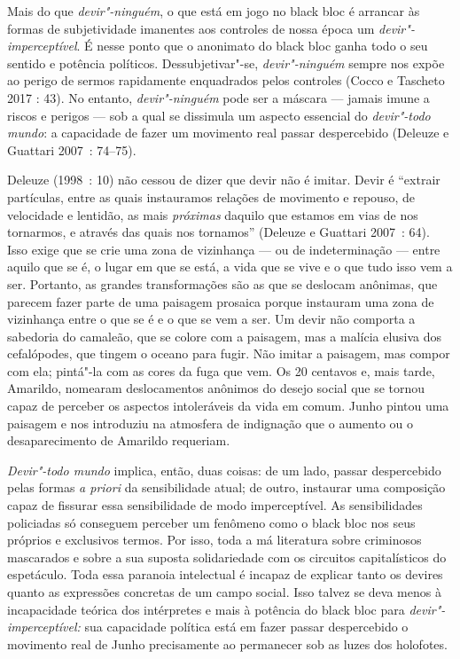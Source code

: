 Mais do que \emph{devir"-ninguém}, o que está em jogo no black bloc
é arrancar às formas de subjetividade imanentes aos controles de nossa
época um \emph{devir"-imperceptível}. É nesse ponto que o anonimato do
black bloc ganha todo o seu sentido e potência políticos.
Dessubjetivar"-se, \emph{devir"-ninguém} sempre nos expõe ao perigo de
sermos rapidamente enquadrados pelos controles (Cocco e Tascheto 2017 :
43). No entanto, \emph{devir"-ninguém} pode ser a máscara --- jamais imune
a riscos e perigos --- sob a qual se dissimula um aspecto essencial do
\emph{devir"-todo mundo}: a capacidade de fazer um movimento real passar
despercebido (Deleuze e Guattari 2007~: 74--75).

Deleuze (1998~: 10) não cessou de dizer que devir não é imitar. Devir é
``extrair partículas, entre as quais instauramos relações de movimento e
repouso, de velocidade e lentidão, as mais\emph{ próximas }daquilo que
estamos em vias de nos tornarmos, e através das quais nos tornamos''
(Deleuze e Guattari 2007~: 64). Isso exige que se crie uma zona de
vizinhança --- ou de indeterminação --- entre aquilo que se é, o lugar em
que se está, a vida que se vive e o que tudo isso vem a ser. Portanto,
as grandes transformações são as que se deslocam anônimas, que parecem
fazer parte de uma paisagem prosaica porque instauram uma zona de
vizinhança entre o que se é e o que se vem a ser. Um devir não comporta
a sabedoria do camaleão, que se colore com a paisagem, mas a malícia
elusiva dos cefalópodes, que tingem o oceano para fugir. Não imitar a
paisagem, mas compor com ela; pintá"-la com as cores da fuga que vem. Os
20 centavos e, mais tarde, Amarildo, nomearam deslocamentos anônimos do
desejo social que se tornou capaz de perceber os aspectos intoleráveis
da vida em comum. Junho pintou uma paisagem e nos introduziu na
atmosfera de indignação que o aumento ou o desaparecimento de Amarildo
requeriam.

\emph{Devir"-todo mundo} implica, então, duas coisas: de um lado, passar
despercebido pelas formas \emph{a priori} da sensibilidade atual; de
outro, instaurar uma composição capaz de fissurar essa sensibilidade de
modo imperceptível. As sensibilidades policiadas só conseguem perceber
um fenômeno como o black bloc nos seus próprios e exclusivos
termos. Por isso, toda a má literatura sobre criminosos mascarados e
sobre a sua suposta solidariedade com os circuitos capitalísticos do
espetáculo. Toda essa paranoia intelectual é incapaz de explicar tanto
os devires quanto as expressões concretas de um campo social. Isso
talvez se deva menos à incapacidade teórica dos intérpretes e mais à
potência do black bloc para \emph{devir"-imperceptível:} sua
capacidade política está em fazer passar despercebido o movimento real
de Junho precisamente ao permanecer sob as luzes dos holofotes.

